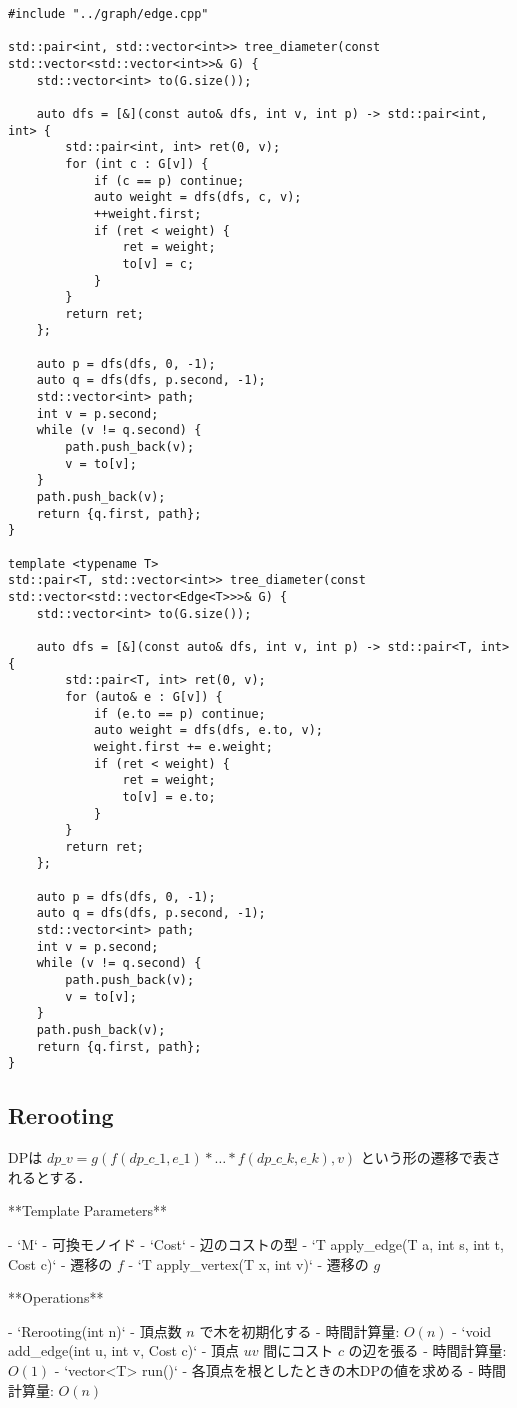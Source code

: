 \begin{lstlisting}
#include "../graph/edge.cpp"

std::pair<int, std::vector<int>> tree_diameter(const std::vector<std::vector<int>>& G) {
    std::vector<int> to(G.size());

    auto dfs = [&](const auto& dfs, int v, int p) -> std::pair<int, int> {
        std::pair<int, int> ret(0, v);
        for (int c : G[v]) {
            if (c == p) continue;
            auto weight = dfs(dfs, c, v);
            ++weight.first;
            if (ret < weight) {
                ret = weight;
                to[v] = c;
            }
        }
        return ret;
    };

    auto p = dfs(dfs, 0, -1);
    auto q = dfs(dfs, p.second, -1);
    std::vector<int> path;
    int v = p.second;
    while (v != q.second) {
        path.push_back(v);
        v = to[v];
    }
    path.push_back(v);
    return {q.first, path};
}

template <typename T>
std::pair<T, std::vector<int>> tree_diameter(const std::vector<std::vector<Edge<T>>>& G) {
    std::vector<int> to(G.size());

    auto dfs = [&](const auto& dfs, int v, int p) -> std::pair<T, int> {
        std::pair<T, int> ret(0, v);
        for (auto& e : G[v]) {
            if (e.to == p) continue;
            auto weight = dfs(dfs, e.to, v);
            weight.first += e.weight;
            if (ret < weight) {
                ret = weight;
                to[v] = e.to;
            }
        }
        return ret;
    };

    auto p = dfs(dfs, 0, -1);
    auto q = dfs(dfs, p.second, -1);
    std::vector<int> path;
    int v = p.second;
    while (v != q.second) {
        path.push_back(v);
        v = to[v];
    }
    path.push_back(v);
    return {q.first, path};
}
\end{lstlisting}

\subsection{Rerooting}

\begin{small}
\begin{markdown}
DPは $dp\_v = g(f(dp\_{c\_1}, e\_1) * \dots * f(dp\_{c\_k}, e\_k), v)$ という形の遷移で表されるとする．

**Template Parameters**

- `M`
    - 可換モノイド
- `Cost`
    - 辺のコストの型
- `T apply\_edge(T a, int s, int t, Cost c)`
    - 遷移の $f$
- `T apply\_vertex(T x, int v)`
    - 遷移の $g$

**Operations**

- `Rerooting(int n)`
    - 頂点数 $n$ で木を初期化する
    - 時間計算量: $O(n)$
- `void add\_edge(int u, int v, Cost c)`
    - 頂点 $uv$ 間にコスト $c$ の辺を張る
    - 時間計算量: $O(1)$
- `vector<T> run()`
    - 各頂点を根としたときの木DPの値を求める
    - 時間計算量: $O(n)$

\end{markdown}
\end{small}

